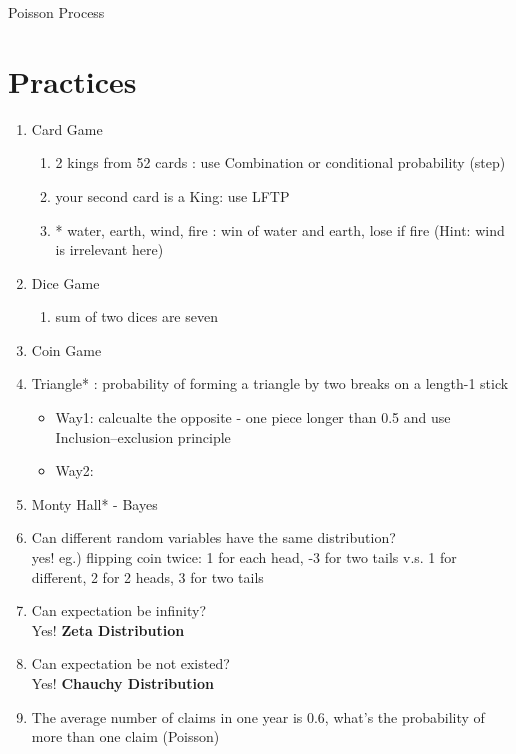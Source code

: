 \documentclass[11pt, openany]{book}              %
\begin{document}
Poisson Process

\section{Practices}

\begin{enumerate}
	\item Card Game
	\begin{enumerate}
		\item 2 kings from 52 cards : use Combination or conditional probability (step)
		\item your second card is a King: use LFTP 
		\item * water, earth, wind, fire : win of water and earth, lose if fire (Hint: wind is irrelevant here)
	\end{enumerate}
	\item Dice Game 
	 \begin{enumerate}
		\item sum of two dices are seven
	  \end{enumerate}	
	 \item Coin Game
	 \item Triangle* : probability of forming a triangle by two breaks on a length-1 stick\\
	 \begin{itemize}
	 	\item Way1: calcualte the opposite - one piece longer than 0.5 and use Inclusion–exclusion principle
	 	\item Way2: 
	 \end{itemize}
     \item  Monty Hall* - Bayes
     \item Can different random variables have the same distribution? \\ yes! eg.) flipping coin twice: 1 for each head, -3 for two tails v.s. 1 for different, 2 for 2 heads, 3 for two tails
     \item Can expectation be infinity? \\ Yes! \textbf{Zeta Distribution}
     \item Can expectation be not existed? \\ Yes! \textbf{Chauchy Distribution}
     \item The average number of claims in one year is 0.6, what's the probability of more than one claim (Poisson)
\end{enumerate}
\end{document}
